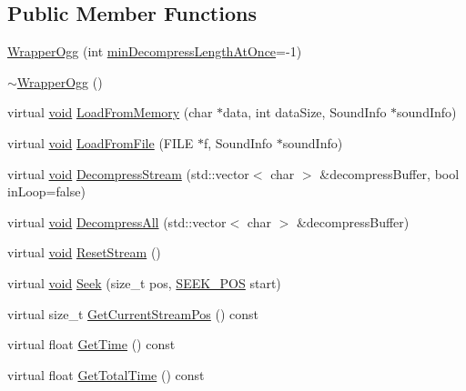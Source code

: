 \subsection*{Public Member Functions}
\begin{DoxyCompactItemize}
\item 
\mbox{\hyperlink{classnjli_1_1_wrapper_ogg_a48f5522a7407346d58fa69c57ffbd369}{Wrapper\+Ogg}} (int \mbox{\hyperlink{classnjli_1_1_wrapper_ogg_ae96fb224e50879ef50c3021fa09ea890}{min\+Decompress\+Length\+At\+Once}}=-\/1)
\item 
\mbox{\hyperlink{classnjli_1_1_wrapper_ogg_a0ca14ff5c8de2e1b024081cd4ee36900}{$\sim$\+Wrapper\+Ogg}} ()
\item 
virtual \mbox{\hyperlink{_thread_8h_af1e856da2e658414cb2456cb6f7ebc66}{void}} \mbox{\hyperlink{classnjli_1_1_wrapper_ogg_a3ba50f99487d489f0b495cfe7fa77811}{Load\+From\+Memory}} (char $\ast$data, int data\+Size, Sound\+Info $\ast$sound\+Info)
\item 
virtual \mbox{\hyperlink{_thread_8h_af1e856da2e658414cb2456cb6f7ebc66}{void}} \mbox{\hyperlink{classnjli_1_1_wrapper_ogg_a315af49a4e484e1cb8689a11dfe9db2f}{Load\+From\+File}} (F\+I\+LE $\ast$f, Sound\+Info $\ast$sound\+Info)
\item 
virtual \mbox{\hyperlink{_thread_8h_af1e856da2e658414cb2456cb6f7ebc66}{void}} \mbox{\hyperlink{classnjli_1_1_wrapper_ogg_a47dbddbb35d013d8250adc8e666c4fdd}{Decompress\+Stream}} (std\+::vector$<$ char $>$ \&decompress\+Buffer, bool in\+Loop=false)
\item 
virtual \mbox{\hyperlink{_thread_8h_af1e856da2e658414cb2456cb6f7ebc66}{void}} \mbox{\hyperlink{classnjli_1_1_wrapper_ogg_ad33e7975379d1e4f5c15944370a4cf47}{Decompress\+All}} (std\+::vector$<$ char $>$ \&decompress\+Buffer)
\item 
virtual \mbox{\hyperlink{_thread_8h_af1e856da2e658414cb2456cb6f7ebc66}{void}} \mbox{\hyperlink{classnjli_1_1_wrapper_ogg_a28d1964b0a03208ebeb30e09ef625c90}{Reset\+Stream}} ()
\item 
virtual \mbox{\hyperlink{_thread_8h_af1e856da2e658414cb2456cb6f7ebc66}{void}} \mbox{\hyperlink{classnjli_1_1_wrapper_ogg_adc4b8116a89e8eb48f65276ec46e8dd2}{Seek}} (size\+\_\+t pos, \mbox{\hyperlink{classnjli_1_1_i_sound_file_wrapper_ab4b07720cb2823b4f3f9fa98ee07a6e7}{S\+E\+E\+K\+\_\+\+P\+OS}} start)
\item 
virtual size\+\_\+t \mbox{\hyperlink{classnjli_1_1_wrapper_ogg_a90e11afb177a4085c5925af77436cd91}{Get\+Current\+Stream\+Pos}} () const
\item 
virtual float \mbox{\hyperlink{classnjli_1_1_wrapper_ogg_a0fdf09ad6e5bde3de915140c39698a97}{Get\+Time}} () const
\item 
virtual float \mbox{\hyperlink{classnjli_1_1_wrapper_ogg_adb921d96c9d60b6539fbc05e08989ffa}{Get\+Total\+Time}} () const
\end{DoxyCompactItemize}
